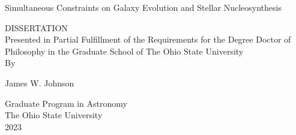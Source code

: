 %
%
%
%
%
%

\begin{titlepage}

%
%

\singlespace

\begin{center}
\vspace*{1.3cm}
{\Large
Simultaneous Constraints on Galaxy Evolution and Stellar Nucleosynthesis
}
\end{center}

%
%
%
%
%

\vspace*{1.0cm}

\begin{center}
DISSERTATION\\
\vspace*{2.0cm}
\singlespace
Presented in Partial Fulfillment of the Requirements for
the Degree Doctor of Philosophy in the Graduate School of The Ohio 
State University\\
\vspace*{1.0cm}
By\\
\vspace*{0.3cm}

\doublespace

%
%
%



James W. Johnson

\vspace*{0.1cm}
Graduate Program in Astronomy\\
\vspace*{1.0cm}
The Ohio State University\\
2023\\


\end{center}
\end{titlepage}
